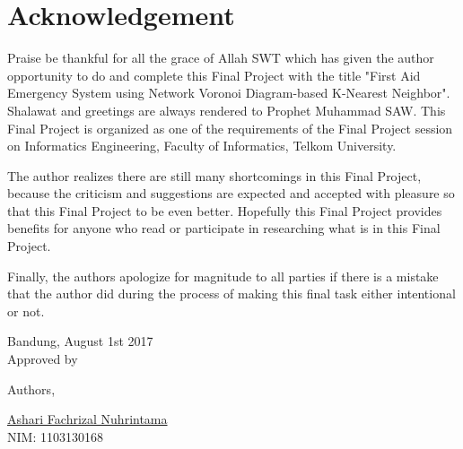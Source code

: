 \chapter*{Acknowledgement}

Praise be thankful for all the grace of Allah SWT which has given the author opportunity to do and complete this Final Project with the title "First Aid Emergency System using Network Voronoi Diagram-based K-Nearest Neighbor". Shalawat and greetings are always rendered to Prophet Muhammad SAW. This Final Project is organized as one of the requirements of the Final Project session on Informatics Engineering, Faculty of Informatics, Telkom University.

The author realizes there are still many shortcomings in this Final Project, because the criticism and suggestions are expected and accepted with pleasure so that this Final Project to be even better. Hopefully this Final Project provides benefits for anyone who read or participate in researching what is in this Final Project.

Finally, the authors apologize for magnitude to all parties if there is a mistake that the author did during the process of making this final task either intentional or not.

\vspace{2cm}


{\setlength{\parindent}{0cm}
{Bandung, August 1st 2017}\\
{Approved by}\\

\vspace{0.5cm}

Authors,

\vspace{2cm}
\underline{Ashari Fachrizal Nuhrintama} \\ 
NIM: 1103130168
}
